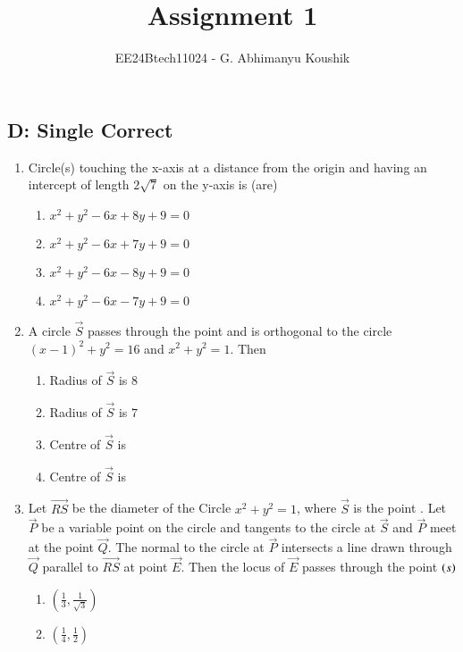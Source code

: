 \documentclass[journal,12pt,twocolumn]{IEEEtran}
\theoremstyle{remark}
\begin{document}
\title{Assignment 1}
\author{EE24Btech11024 - G. Abhimanyu Koushik}
\maketitle
\renewcommand{\thefigure}{\theenumi}
\renewcommand{\thetable}{\theenumi}
\subsection*{D: Single Correct}
\begin{enumerate}
\item Circle(s) touching the x-axis at a distance  from the origin and having an intercept of length $2\sqrt{7}$ on the y-axis is (are)
\hfill {}
\begin{enumerate}[label=(\alph*)]
\item $x^2 + y^2 - 6x + 8y + 9 = 0$
\item $x^2 + y^2 - 6x + 7y + 9 = 0$
\item $x^2 + y^2 - 6x - 8y + 9 = 0$
\item $x^2 + y^2 - 6x - 7y + 9 = 0$
\end{enumerate}
\item A circle $\vec{S}$ passes through the point  and is orthogonal to the circle $(x-1)^2+y^2=16$ and $x^2+y^2=1$. Then
\hfill{}
\begin{enumerate}[label=(\alph*)]
\item Radius of $\vec{S}$ is $8$
\item Radius of $\vec{S}$ is $7$
\item Centre of $\vec{S}$ is 
\item Centre of $\vec{S}$ is 
\end{enumerate}
\item Let $\vec{RS}$ be the diameter of the Circle $x^{2} + y^{2} = 1$, where $\vec{S}$ is the point . Let $\vec{P}$ be a variable point  on the circle and tangents to the circle at $\vec{S}$ and $\vec{P}$ meet at the point $\vec{Q}$. The normal to the circle at $\vec{P}$ intersects a line drawn through $\vec{Q}$ parallel to $\vec{RS}$ at point $\vec{E}$. Then the locus of $\vec{E}$ passes through the point $\left(s\right)$
\hfill{}
\begin{enumerate}[label=(\alph*)]
\item $\left(\frac{1}{3}, \frac{1}{\sqrt{3}}\right)$
\item $\left(\frac{1}{4}, \frac{1}{2} \right)$

\end{enumerate}
\end{enumerate}
\end{document}
